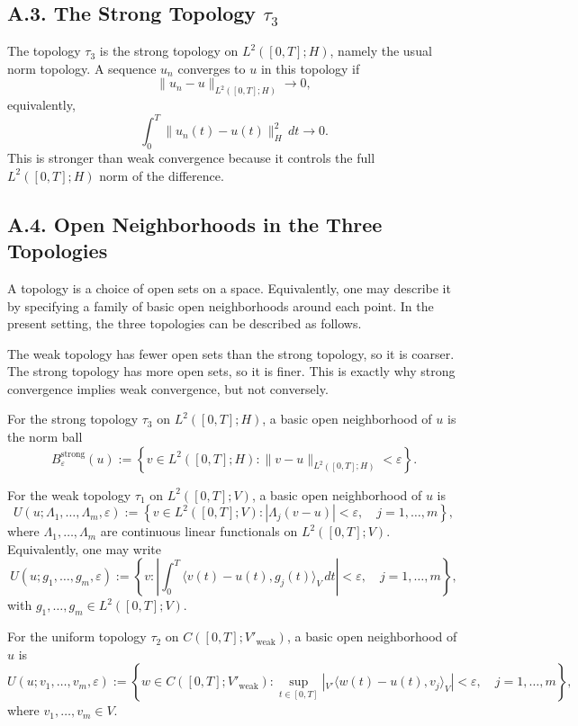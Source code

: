 \documentclass[11pt]{article}
\theoremstyle{definition}
\theoremstyle{remark}
\newcommand{\dual}[2]{{}_{V'}\langle #1, #2 \rangle_{V}}
\begin{document}
\subsection*{A.3. The Strong Topology $\tau_3$}
The topology $\tau_3$ is the strong topology on $L^2([0,T];H)$, namely the usual norm topology. A sequence $u_n$ converges to $u$ in this topology if
\[
  \|u_n-u\|_{L^2([0,T];H)}\to 0,
\]
equivalently,
\[
  \int_0^T \|u_n(t)-u(t)\|_H^2\,dt \to 0.
\]
This is stronger than weak convergence because it controls the full $L^2([0,T];H)$ norm of the difference.

\subsection*{A.4. Open Neighborhoods in the Three Topologies}
A topology is a choice of open sets on a space. Equivalently, one may describe it by specifying a family of basic open neighborhoods around each point. In the present setting, the three topologies can be described as follows.

The weak topology has fewer open sets than the strong topology, so it is coarser. The strong topology has more open sets, so it is finer. This is exactly why strong convergence implies weak convergence, but not conversely.

For the strong topology $\tau_3$ on $L^2([0,T];H)$, a basic open neighborhood of $u$ is the norm ball
\[
  B^{\mathrm{strong}}_\varepsilon(u)
  :=
  \left\{
    v\in L^2([0,T];H):
    \|v-u\|_{L^2([0,T];H)}<\varepsilon
  \right\}.
\]

For the weak topology $\tau_1$ on $L^2([0,T];V)$, a basic open neighborhood of $u$ is
\[
  U(u;\Lambda_1,\dots,\Lambda_m,\varepsilon)
  :=
  \left\{
    v\in L^2([0,T];V):
    |\Lambda_j(v-u)|<\varepsilon,\quad j=1,\dots,m
  \right\},
\]
where $\Lambda_1,\dots,\Lambda_m$ are continuous linear functionals on $L^2([0,T];V)$. Equivalently, one may write
\[
  U(u;g_1,\dots,g_m,\varepsilon)
  :=
  \left\{
    v:
    \left|
      \int_0^T \langle v(t)-u(t),g_j(t)\rangle_V\,dt
    \right|<\varepsilon,\quad j=1,\dots,m
  \right\},
\]
with $g_1,\dots,g_m\in L^2([0,T];V)$.

For the uniform topology $\tau_2$ on $C([0,T];V'_{\mathrm{weak}})$, a basic open neighborhood of $u$ is
\[
  U(u;v_1,\dots,v_m,\varepsilon)
  :=
  \left\{
    w\in C([0,T];V'_{\mathrm{weak}}):
    \sup_{t\in[0,T]}
    \left|
      \dual{w(t)-u(t)}{v_j}
    \right|<\varepsilon,\quad j=1,\dots,m
  \right\},
\]
where $v_1,\dots,v_m\in V$.
\end{document}

